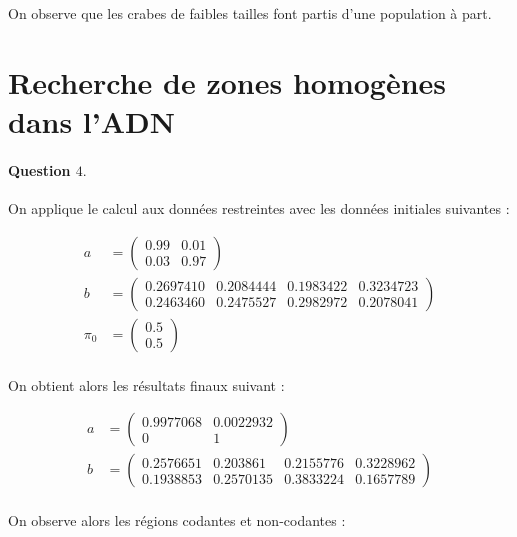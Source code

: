 \documentclass[12pt,a4paper]{article}
\begin{document}
On observe que les crabes de faibles tailles font partis d'une population à part.

\section{Recherche de zones homogènes dans l'\textsc{ADN}}

\paragraph*{Question $4.$} On applique le calcul aux données restreintes avec les données initiales suivantes :

\begin{align*}
a &= \begin{pmatrix}
0.99 & 0.01 \\
0.03 & 0.97
\end{pmatrix} \\
b &= \begin{pmatrix}
0.2697410 & 0.2084444 & 0.1983422 & 0.3234723 \\
0.2463460 & 0.2475527 & 0.2982972 & 0.2078041
\end{pmatrix}\\
\pi_0 &= \begin{pmatrix}
0.5 \\
0.5
\end{pmatrix} \\
\end{align*}

On obtient alors les résultats finaux suivant :

\begin{align*}
a &= \begin{pmatrix}
0.9977068 & 0.0022932 \\
0 		  & 1
\end{pmatrix} \\
b &= \begin{pmatrix}
0.2576651 & 0.203861  & 0.2155776 & 0.3228962 \\  
0.1938853 & 0.2570135 & 0.3833224 & 0.1657789
\end{pmatrix}\\
\end{align*}

On observe alors les régions codantes et non-codantes :
\end{document}
